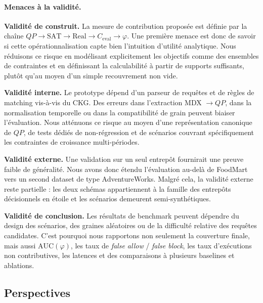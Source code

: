 \documentclass[journal]{IEEEtran}
\begin{document}
\paragraph*{Menaces à la validité.}

\textbf{Validité de construit.} La mesure de contribution proposée est définie par la chaîne $QP \rightarrow \mathrm{SAT} \rightarrow \mathrm{Real} \rightarrow C_{\mathrm{eval}} \rightarrow \varphi$. Une première menace est donc de savoir si cette opérationnalisation capte bien l'intuition d'utilité analytique. Nous réduisons ce risque en modélisant explicitement les objectifs comme des ensembles de contraintes et en définissant la calculabilité à partir de supports suffisants, plutôt qu'au moyen d'un simple recouvrement non vide.

\textbf{Validité interne.} Le prototype dépend d'un parseur de requêtes et de règles de matching vis-à-vis du CKG. Des erreurs dans l'extraction MDX $\rightarrow QP$, dans la normalisation temporelle ou dans la compatibilité de grain peuvent biaiser l'évaluation. Nous atténuons ce risque au moyen d'une représentation canonique de $QP$, de tests dédiés de non-régression et de scénarios couvrant spécifiquement les contraintes de croissance multi-périodes.

\textbf{Validité externe.} Une validation sur un seul entrepôt fournirait une preuve faible de généralité. Nous avons donc étendu l'évaluation au-delà de FoodMart vers un second dataset de type AdventureWorks. Malgré cela, la validité externe reste partielle : les deux schémas appartiennent à la famille des entrepôts décisionnels en étoile et les scénarios demeurent semi-synthétiques.

\textbf{Validité de conclusion.} Les résultats de benchmark peuvent dépendre du design des scénarios, des graines aléatoires ou de la difficulté relative des requêtes candidates. C'est pourquoi nous rapportons non seulement la couverture finale, mais aussi $\mathrm{AUC}(\varphi)$, les taux de \emph{false allow} / \emph{false block}, les taux d'exécutions non contributives, les latences et des comparaisons à plusieurs baselines et ablations.

\subsection{Perspectives}
\end{document}
